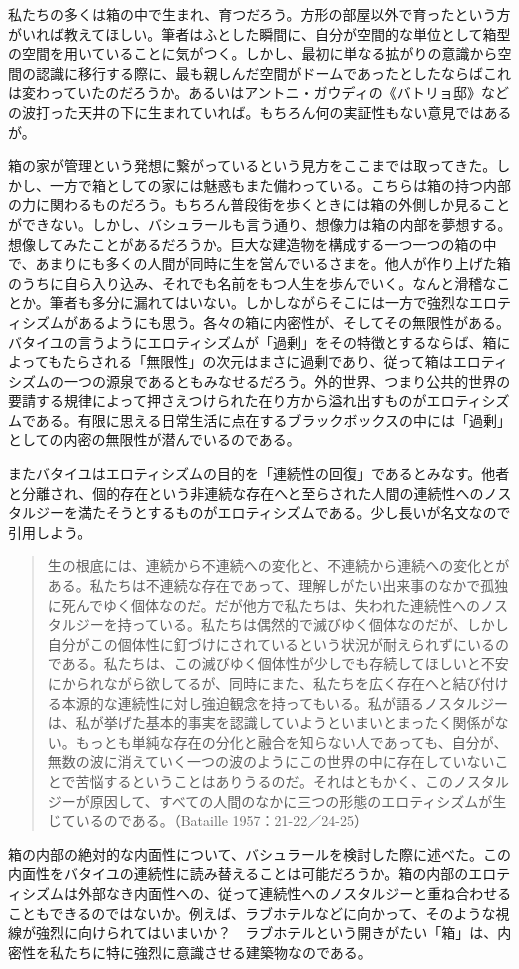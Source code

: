 \documentclass[b5j,twoside,twocolumn]{utarticle}
\begin{document}
私たちの多くは箱の中で生まれ、育つだろう。方形の部屋以外で育ったという方がいれば教えてほしい。筆者はふとした瞬間に、自分が空間的な単位として箱型の空間を用いていることに気がつく。しかし、最初に単なる拡がりの意識から空間の認識に移行する際に、最も親しんだ空間がドームであったとしたならばこれは変わっていたのだろうか。あるいはアントニ・ガウディの《バトリョ邸》などの波打った天井の下に生まれていれば。もちろん何の実証性もない意見ではあるが。


箱の家が管理という発想に繋がっているという見方をここまでは取ってきた。しかし、一方で箱としての家には魅惑もまた備わっている。こちらは箱の持つ内部の力に関わるものだろう。もちろん普段街を歩くときには箱の外側しか見ることができない。しかし、バシュラールも言う通り、想像力は箱の内部を夢想する。想像してみたことがあるだろうか。巨大な建造物を構成する一つ一つの箱の中で、あまりにも多くの人間が同時に生を営んでいるさまを。他人が作り上げた箱のうちに自ら入り込み、それでも名前をもつ人生を歩んでいく。なんと滑稽なことか。筆者も多分に漏れてはいない。しかしながらそこには一方で強烈なエロティシズムがあるようにも思う。各々の箱に内密性が、そしてその無限性がある。バタイユの言うようにエロティシズムが「過剰」をその特徴とするならば、箱によってもたらされる「無限性」の次元はまさに過剰であり、従って箱はエロティシズムの一つの源泉であるともみなせるだろう。外的世界、つまり公共的世界の要請する規律によって押さえつけられた在り方から溢れ出すものがエロティシズムである。有限に思える日常生活に点在するブラックボックスの中には「過剰」としての内密の無限性が潜んでいるのである。


またバタイユはエロティシズムの目的を「連続性の回復」であるとみなす。他者と分離され、個的存在という非連続な存在へと至らされた人間の連続性へのノスタルジーを満たそうとするものがエロティシズムである。少し長いが名文なので引用しよう。
\begin{quote}
生の根底には、連続から不連続への変化と、不連続から連続への変化とがある。私たちは不連続な存在であって、理解しがたい出来事のなかで孤独に死んでゆく個体なのだ。だが他方で私たちは、失われた連続性へのノスタルジーを持っている。私たちは偶然的で滅びゆく個体なのだが、しかし自分がこの個体性に釘づけにされているという状況が耐えられずにいるのである。私たちは、この滅びゆく個体性が少しでも存続してほしいと不安にかられながら欲してるが、同時にまた、私たちを広く存在へと結び付ける本源的な連続性に対し強迫観念を持ってもいる。私が語るノスタルジーは、私が挙げた基本的事実を認識していようといまいとまったく関係がない。もっとも単純な存在の分化と融合を知らない人であっても、自分が、無数の波に消えていく一つの波のようにこの世界の中に存在していないことで苦悩するということはありうるのだ。それはともかく、このノスタルジーが原因して、すべての人間のなかに三つの形態のエロティシズムが生じているのである。（Bataille 1957：21-22／24-25）
\end{quote}
箱の内部の絶対的な内面性について、バシュラールを検討した際に述べた。この内面性をバタイユの連続性に読み替えることは可能だろうか。箱の内部のエロティシズムは外部なき内面性への、従って連続性へのノスタルジーと重ね合わせることもできるのではないか。例えば、ラブホテルなどに向かって、そのような視線が強烈に向けられてはいまいか？　ラブホテルという開きがたい「箱」は、内密性を私たちに特に強烈に意識させる建築物なのである。
\end{document}

